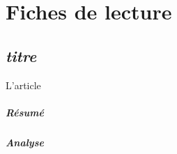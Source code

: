 \documentclass[11pt, french]{report-rd-info}
\begin{document}
\chapter{Fiches de lecture}
\label{ann:FichesLecture}

\section{\emph{titre}}
L'article \cite{ref}

\paragraph{Résumé}

\paragraph{Analyse}
\end{document}
